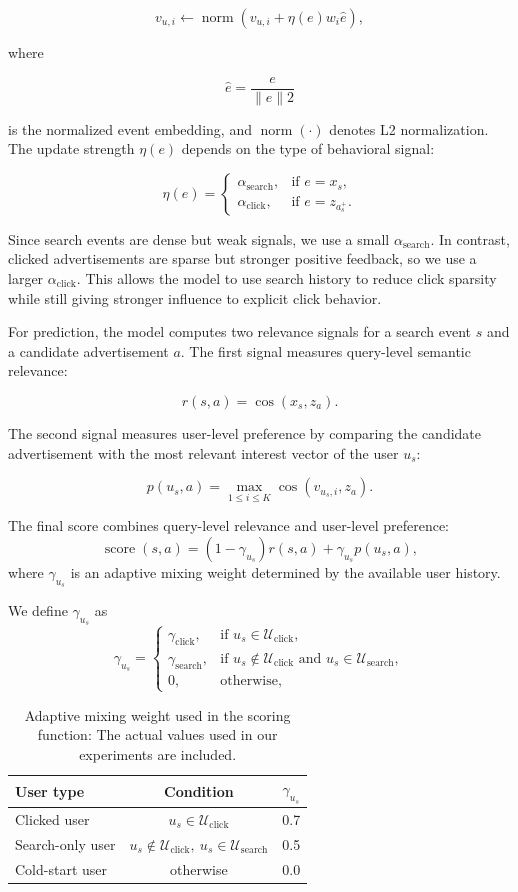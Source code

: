 \documentclass[sigconf, nonacm]{acmart}
\begin{document}
\[
v_{u,i}
\leftarrow
\operatorname{norm}
\left(
v_{u,i} + \eta(e) w_i \hat{e}
\right),
\]

where

\[
\hat{e} = \frac{e}{\lVert e \rVert2}
\]

is the normalized event embedding, and $\operatorname{norm}(\cdot)$ denotes L2 normalization. The update strength $\eta(e)$ depends on the type of behavioral signal:

\[
\eta(e)=
\begin{cases}
\alpha_{\text{search}}, & \text{if } e=x_s, \\
\alpha_{\text{click}}, & \text{if } e=z_{a_s^+}.
\end{cases}
\]

Since search events are dense but weak signals, we use a small $\alpha_{\text{search}}$. In contrast, clicked advertisements are sparse but stronger positive feedback, so we use a larger $\alpha_{\text{click}}$. This allows the model to use search history to reduce click sparsity while still giving stronger influence to explicit click behavior.

For prediction, the model computes two relevance signals for a search event \(s\) and a candidate advertisement \(a\). The first signal measures query-level semantic relevance:

\[
r(s,a) = \cos(x_s, z_a).
\]

The second signal measures user-level preference by comparing the candidate advertisement with the most relevant interest vector of the user $u_s$:

\[
p(u_s,a) =
\max_{1 \le i \le K}
\cos(v_{u_s,i}, z_a).
\]

The final score combines query-level relevance and user-level preference:
\[
\operatorname{score}(s,a)
=
(1-\gamma_{u_s}) r(s,a)
+
\gamma_{u_s} p(u_s,a),
\]
where \(\gamma_{u_s}\) is an adaptive mixing weight determined by the available user history.

We define \(\gamma_{u_s}\) as
\[
\gamma_{u_s} =
\begin{cases}
\gamma_{\text{click}}, & \text{if } u_s \in \mathcal{U}_{\text{click}}, \\
\gamma_{\text{search}}, & \text{if } u_s \notin \mathcal{U}_{\text{click}} \text{ and } u_s \in \mathcal{U}_{\text{search}}, \\
0, & \text{otherwise},
\end{cases}
\]

\begin{table}[h]
\centering
\caption{Adaptive mixing weight used in the scoring function: The actual values used in our experiments are included.}
\label{tab:adaptive-gamma}
\begin{tabular}{lcc}
\toprule
User type & Condition & \(\gamma_{u_s}\) \\
\midrule
Clicked user & \(u_s \in \mathcal{U}_{\text{click}}\) & 0.7 \\
Search-only user & \(u_s \notin \mathcal{U}_{\text{click}},\ u_s \in \mathcal{U}_{\text{search}}\) & 0.5 \\
Cold-start user & otherwise & 0.0 \\
\bottomrule
\end{tabular}
\end{table}
\end{document}
